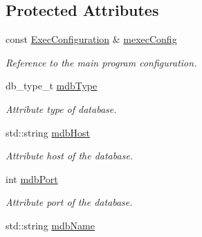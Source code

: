 \subsection*{Protected Attributes}
\begin{DoxyCompactItemize}
\item 
\hypertarget{classDbConfiguration_aec42c79cc0d155ffc54ddfa8ee9daecd}{
const \hyperlink{classExecConfiguration}{ExecConfiguration} \& \hyperlink{classDbConfiguration_aec42c79cc0d155ffc54ddfa8ee9daecd}{mexecConfig}}
\label{classDbConfiguration_aec42c79cc0d155ffc54ddfa8ee9daecd}

\begin{DoxyCompactList}\small\item\em Reference to the main program configuration. \item\end{DoxyCompactList}\item 
\hypertarget{classDbConfiguration_a702c7cf89e77b3fd6ececcd51734c5b6}{
db\_\-type\_\-t \hyperlink{classDbConfiguration_a702c7cf89e77b3fd6ececcd51734c5b6}{mdbType}}
\label{classDbConfiguration_a702c7cf89e77b3fd6ececcd51734c5b6}

\begin{DoxyCompactList}\small\item\em Attribute type of database. \item\end{DoxyCompactList}\item 
\hypertarget{classDbConfiguration_a99de17b15f3b8fa9e7ed76f564cbeaf0}{
std::string \hyperlink{classDbConfiguration_a99de17b15f3b8fa9e7ed76f564cbeaf0}{mdbHost}}
\label{classDbConfiguration_a99de17b15f3b8fa9e7ed76f564cbeaf0}

\begin{DoxyCompactList}\small\item\em Attribute host of the database. \item\end{DoxyCompactList}\item 
\hypertarget{classDbConfiguration_a25508bbd318ad0a595dfcb05bb1a6a28}{
int \hyperlink{classDbConfiguration_a25508bbd318ad0a595dfcb05bb1a6a28}{mdbPort}}
\label{classDbConfiguration_a25508bbd318ad0a595dfcb05bb1a6a28}

\begin{DoxyCompactList}\small\item\em Attribute port of the database. \item\end{DoxyCompactList}\item 
\hypertarget{classDbConfiguration_aeb3141eddb0bdb0081dee5e23ae9a29a}{
std::string \hyperlink{classDbConfiguration_aeb3141eddb0bdb0081dee5e23ae9a29a}{mdbName}}
\label{classDbConfiguration_aeb3141eddb0bdb0081dee5e23ae9a29a}


\end{DoxyCompactItemize}
